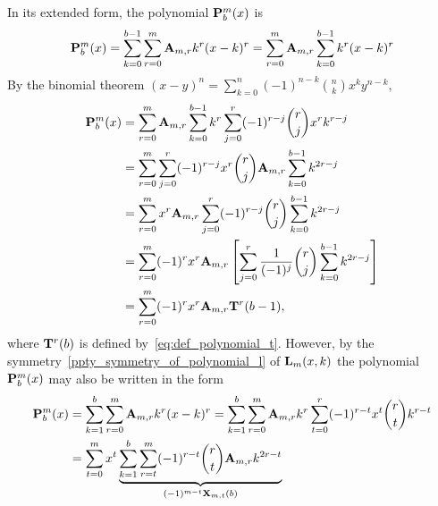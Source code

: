 In its extended form, the polynomial ${\mathbf{P}}\sp{m} \sb{b}(x)$ is
\begin{equation*}
    \begin{split}
        {\mathbf{P}}\sp{m} \sb{b}(x) =\sum_{k=0}^{b-1} \sum_{r=0}^{m} {\mathbf{A}} \sb{m,r} k^r(x-k)^r
        =\sum_{r=0}^{m} {\mathbf{A}} \sb{m,r} \sum_{k=0}^{b-1} k^r(x-k)^r \\
    \end{split}
\end{equation*}
By the binomial theorem $(x-y)^n = \sum_{k=0}^{n} (-1)^{n-k} \binom{n}{k} x^k y^{n-k}$,
\begin{equation*}
    \begin{split}
        {\mathbf{P}}\sp{m} \sb{b}(x)
        &=\sum_{r=0}^{m} {\mathbf{A}} \sb{m,r} \sum_{k=0}^{b-1} k^r \sum_{j=0}^{r} (-1)^{r-j} \binom{r}{j} x^{r} k^{r-j} \\
        &=\sum_{r=0}^{m} \sum_{j=0}^{r} (-1)^{r-j} x^{r} \binom{r}{j} {\mathbf{A}} \sb{m,r} \sum_{k=0}^{b-1} k^{2r-j} \\
        &=\sum_{r=0}^{m} x^{r} {\mathbf{A}} \sb{m,r} \sum_{j=0}^{r} (-1)^{r-j} \binom{r}{j} \sum_{k=0}^{b-1} k^{2r-j} \\
        &=\sum_{r=0}^{m} (-1)^{r} x^{r} {\mathbf{A}} \sb{m,r}
        \left[ \sum_{j=0}^{r} \frac{1}{(-1)^j} \binom{r}{j} \sum_{k=0}^{b-1} k^{2r-j} \right] \\
        &=\sum_{r=0}^{m} (-1)^{r} x^{r} {\mathbf{A}} \sb{m,r} {\mathbf{T}}\sp{r} (b-1), \\
    \end{split}
\end{equation*}
where ${\mathbf{T}}\sp{r} (b)$ is defined by~\eqref{eq:def_polynomial_t}.
However, by the symmetry~\eqref{ppty_symmetry_of_polynomial_l} of ${\mathbf{L}}\sb{m}(x,k)$ the polynomial
${\mathbf{P}}\sp{m} \sb{b}(x)$ may also be written in the form
\begin{equation*}
    \begin{split}
        {\mathbf{P}}\sp{m} \sb{b}(x)
        &=\sum_{k=1}^{b} \sum_{r=0}^{m} {\mathbf{A}} \sb{m,r} k^r(x-k)^r
        =\sum_{k=1}^{b} \sum_{r=0}^{m} {\mathbf{A}} \sb{m,r} k^r \sum_{t=0}^{r} (-1)^{r-t} x^t \binom{r}{t} k^{r-t} \\
        &=\sum_{t=0}^{m} x^t
        \underbrace{\sum_{k=1}^{b} \sum_{r=t}^{m} (-1)^{r-t} \binom{r}{t} {\mathbf{A}} \sb{m,r} k^{2r-t}}_{(-1)^{m-t} {\mathbf{X}}\sb{m,t} (b)}
    \end{split}
\end{equation*}
